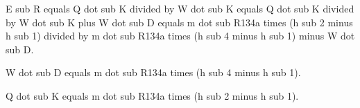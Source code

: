 E sub R equals Q dot sub K divided by W dot sub K equals Q dot sub K divided by W dot sub K plus W dot sub D equals m dot sub R134a times (h sub 2 minus h sub 1) divided by m dot sub R134a times (h sub 4 minus h sub 1) minus W dot sub D.  

W dot sub D equals m dot sub R134a times (h sub 4 minus h sub 1).  

Q dot sub K equals m dot sub R134a times (h sub 2 minus h sub 1).